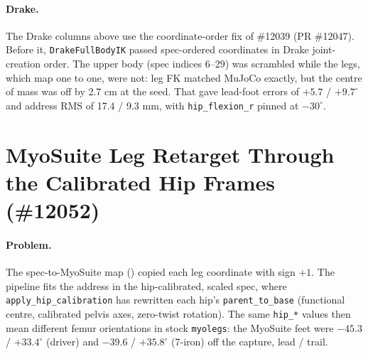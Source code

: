 \documentclass[11pt]{article}
\begin{document}
\paragraph{Drake.} The Drake columns above use the coordinate-order fix of
\#12039 (PR \#12047). Before it, \texttt{DrakeFullBodyIK} passed spec-ordered
coordinates in Drake joint-creation order. The upper body (spec indices
6--29) was scrambled while the legs, which map one to one, were not: leg FK
matched MuJoCo exactly, but the centre of mass was off by 2.7 cm at the seed.
That gave lead-foot errors of $+5.7$ / $+9.7^\circ$ and address RMS of 17.4 /
9.3 mm, with \texttt{hip\_flexion\_r} pinned at $-30^\circ$.

\section{MyoSuite Leg Retarget Through the Calibrated Hip Frames (\#12052)}
\label{sec:myo}

\paragraph{Problem.} The spec-to-MyoSuite map
() copied each leg coordinate with sign
$+1$. The pipeline fits the address in the hip-calibrated, scaled spec, where
\texttt{apply\_hip\_calibration} has rewritten each hip's
\texttt{parent\_to\_base} (functional centre, calibrated pelvis axes,
zero-twist rotation). The same \texttt{hip\_*} values then mean different
femur orientations in stock \texttt{myolegs}: the MyoSuite feet were
$-45.3$ / $+33.4^\circ$ (driver) and $-39.6$ / $+35.8^\circ$ (7-iron) off
the capture, lead / trail.
\end{document}
